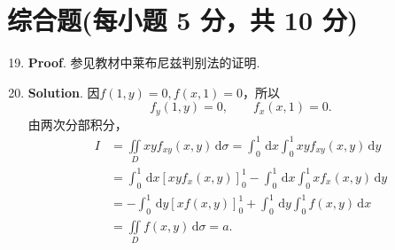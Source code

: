 \documentclass[../Main.tex]{subfiles}
\begin{document}
\section{综合题(每小题 5 分，共 10 分)}
\begin{enumerate}
  \setcounter{enumi}{18}
  \item \textbf{Proof}. 参见教材中莱布尼兹判别法的证明.

  \item \textbf{Solution}. 因$f(1,y)=0,f(x,1)=0$，所以
        \[
          f_{y}(1,y)=0,\qquad f_{x}(x,1)=0.
        \]
        由两次分部积分，
        \[
          \begin{aligned}
            I
             & =\iint\limits_{D}xyf_{xy}(x,y)\,\mathrm{d}\sigma
            =\int_{0}^{1}\,\mathrm{d}x\int_{0}^{1}xyf_{xy}(x,y)\,\mathrm{d}y \\
             & =\int_{0}^{1}\,\mathrm{d}x\left[xyf_{x}(x,y)\right]_{0}^{1}
            -\int_{0}^{1}\,\mathrm{d}x\int_{0}^{1}xf_{x}(x,y)\,\mathrm{d}y   \\
             & =-\int_{0}^{1}\,\mathrm{d}y\left[xf(x,y)\right]_{0}^{1}
            +\int_{0}^{1}\,\mathrm{d}y\int_{0}^{1}f(x,y)\,\mathrm{d}x        \\
             & =\iint\limits_{D}f(x,y)\,\mathrm{d}\sigma=a.
          \end{aligned}
        \]
\end{enumerate}
\end{document}
